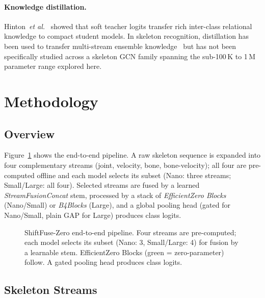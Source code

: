 \documentclass[sigconf,screen,review,anonymous]{acmart}
\newcommand{\etal}{\emph{et al.}}
\begin{document}
\paragraph{Knowledge distillation.}
Hinton~\etal~\cite{kd} showed that soft teacher logits transfer rich
inter-class relational knowledge to compact student models.
In skeleton recognition, distillation has been used to transfer
multi-stream ensemble knowledge~\cite{efficientgcn} but has not been
specifically studied across a skeleton GCN family spanning the
sub-100\,K to 1\,M parameter range explored here.

\section{Methodology}\label{sec:method}

\subsection{Overview}\label{sec:overview}

Figure~\ref{fig:overview} shows the end-to-end pipeline.
A raw skeleton sequence is expanded into four complementary streams
(joint, velocity, bone, bone-velocity); all four are pre-computed offline
and each model selects its subset (Nano: three streams; Small/Large: all four).
Selected streams are fused by a learned \emph{StreamFusionConcat} stem,
processed by a stack of \emph{EfficientZero Blocks} (Nano/Small) or \emph{B4Blocks} (Large),
and a global pooling head (gated for Nano/Small, plain GAP for Large) produces class logits.

\begin{figure}[htpb]\vspace{-2mm}
\centering
\resizebox{0.80\columnwidth}{!}{}
\caption{ShiftFuse-Zero end-to-end pipeline. Four streams are pre-computed;
  each model selects its subset (Nano: 3, Small/Large: 4) for fusion
  by a learnable stem. EfficientZero Blocks (green = zero-parameter) follow.
  A gated pooling head produces class logits.}
\label{fig:overview}
\vspace{-3mm}\end{figure}

\subsection{Skeleton Streams}\label{sec:repr}
\end{document}
